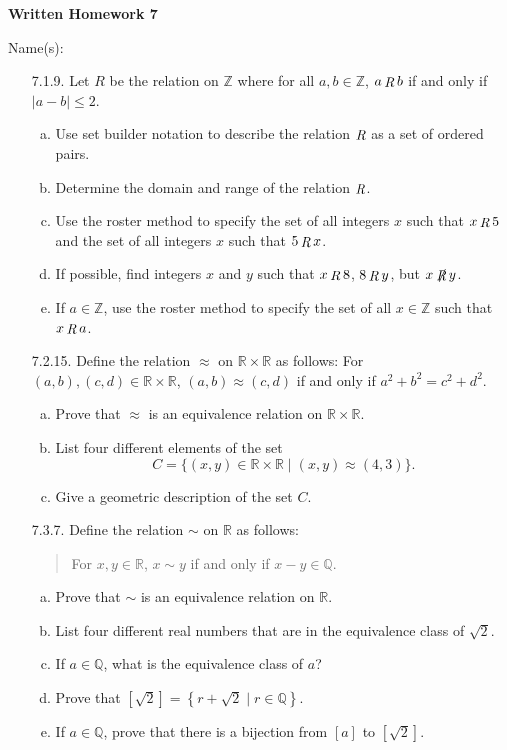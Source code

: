 \documentclass[11pt]{article}
\newcommand{\Z}{\mathbb Z}
\newcommand{\R}{\mathbb R}
\newcommand{\Q}{\mathbb Q}
\DeclareMathOperator{\RR}{{\it R}}
\newcommand{\abs}[1]{\lvert#1\rvert}
\begin{document}
\centerline{\bf Written Homework 7}

\centerline{Name(s):}

\begin{itemize}
\item[7.1.9.] Let $R$ be the relation on $\Z$ where for all $a,b\in \Z$, $a\RR b$ if and only if $\abs{a-b}\le 2$.

\begin{enumerate}[(a)]
\item Use set builder notation to describe the relation $\RR$ as a set of ordered pairs.
\item Determine the domain and range of the relation $\RR$.
\item Use the roster method to specify the set of all integers $x$ such that $x\RR 5$ and the set of all integers $x$ such that $5\RR x$.
\item If possible, find integers $x$ and $y$ such that $x\RR 8$, $8\RR y$, but $x\not \!\!\RR y$.
\item If $a\in \Z$, use the roster method to specify the set of all $x\in \Z$ such that $x\RR a$.

\end{enumerate}

\hrulefill

\item[7.2.15.] Define the relation $\approx$ on $\R\times\R$ as follows: For $(a,b),(c,d)\in\R\times\R$, $(a,b)\approx(c,d)$ if and only if $a^2+b^2=c^2+d^2$.
\begin{enumerate}[(a)]
\item Prove that $\approx$ is an equivalence relation on $\R\times\R$.
\item List four different elements of the set 
\[
C=\{(x,y)\in\R\times\R\mid(x,y)\approx (4,3)\}.
\]
\item Give a geometric description of the set $C$.

\end{enumerate}

\hrulefill

\item[7.3.7.] Define the relation $\sim$ on $\R$ as follows:
\begin{quote}
For $x,y\in\R$, $x\sim y$ if and only if $x-y\in\Q$.
\end{quote}
\begin{enumerate}[(a)]
\item Prove that $\sim$ is an equivalence relation on $\R$.
\item List four different real numbers that are in the equivalence class of $\sqrt 2$.
\item If $a\in\Q$, what is the equivalence class of $a$?
\item Prove that $\left[\sqrt 2\right]=\left\{r+\sqrt 2\mid r\in\Q\right\}$.
\item If $a\in \Q$, prove that there is a bijection from $[a]$ to $\left[\sqrt 2\right]$.
\end{enumerate}

\end{itemize}
\end{document}
